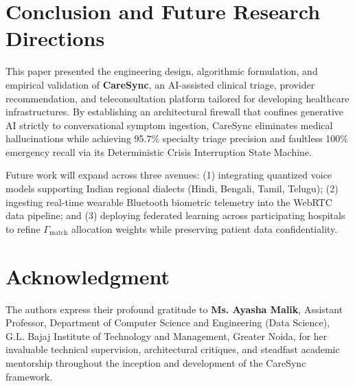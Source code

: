 \documentclass[conference]{IEEEtran}
\begin{document}
\section{Conclusion and Future Research Directions}
This paper presented the engineering design, algorithmic formulation, and empirical validation of \textbf{CareSync}, an AI-assisted clinical triage, provider recommendation, and teleconsultation platform tailored for developing healthcare infrastructures. By establishing an architectural firewall that confines generative AI strictly to conversational symptom ingestion, CareSync eliminates medical hallucinations while achieving 95.7\% specialty triage precision and faultless 100\% emergency recall via its Deterministic Crisis Interruption State Machine.

Future work will expand across three avenues: (1) integrating quantized voice models supporting Indian regional dialects (Hindi, Bengali, Tamil, Telugu); (2) ingesting real-time wearable Bluetooth biometric telemetry into the WebRTC data pipeline; and (3) deploying federated learning across participating hospitals to refine $\Gamma_{\text{match}}$ allocation weights while preserving patient data confidentiality.

\section*{Acknowledgment}
The authors express their profound gratitude to \textbf{Ms. Ayasha Malik}, Assistant Professor, Department of Computer Science and Engineering (Data Science), G.L. Bajaj Institute of Technology and Management, Greater Noida, for her invaluable technical supervision, architectural critiques, and steadfast academic mentorship throughout the inception and development of the CareSync framework.
\end{document}
